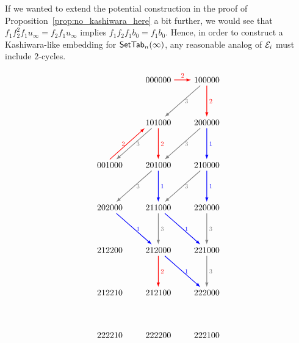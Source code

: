 \documentclass[11pt]{article}
\begin{document}
If we wanted to extend the potential construction in the proof of Proposition~\ref{prop:no_kashiwara_here} a bit further, we would see that $f_1 f_2^2 f_1 u_{\infty} = f_2 f_1 u_{\infty}$ implies $f_1 f_2 f_1 b_0 = f_1 b_0$.
Hence, in order to construct a Kashiwara-like embedding for $\mathsf{SetTab}_n(\infty)$, any reasonable analog of $\mathcal E_i$ must include $2$-cycles.


\begin{figure}[t]
\[
\begin{tikzpicture}[xscale=2, yscale=1.75,>=latex,baseline=(D0.base)]
\node at (1,0) (A1) {$000000$};
\node at (2,0) (A2) {$100000$};
%
\node at (1,-1) (B1) {$101000$};
\node at (2,-1) (B2) {$200000$};
%
\node at (0,-2) (C0) {$001000$};
\node at (1,-2) (C1) {$201000$};
\node at (2,-2) (C2) {$210000$};
%
\node at (0,-3) (D0) {$202000$};
\node at (1,-3) (D1) {$211000$};
\node at (2,-3) (D2) {$220000$};
%
\node at (0,-4) (E0) {$212200$};
\node at (1,-4) (E1) {$212000$};
\node at (2,-4) (E2) {$221000$};
%
\node at (0,-5) (F0) {$212210$};
\node at (1,-5) (F1) {$212100$};
\node at (2,-5) (F2) {$222000$};
%
\node at (0,-6) (G0) {$222210$};
\node at (1,-6) (G1) {$222200$};
\node at (2,-6) (G2) {$222100$};
\draw[->,thick,red]  (A1) -- (A2) node[midway,above,scale=0.75] {$2$};
%
\draw[->,thick,red]  (A2) -- (B2) node[midway,right,scale=0.75] {$2$};
\draw[->,thick,gray]  (A2) -- (B1) node[midway,right,scale=0.75] {$3$};
%
\draw[->,thick,gray]  (B1) -- (C0) node[midway,right,scale=0.75] {$3$};
\draw[->,thick,red]  (B1) -- (C1) node[midway,right,scale=0.75] {$2$};
\draw[->,thick,gray]  (B2) -- (C1) node[midway,right,scale=0.75] {$3$};
\draw[->,thick,blue]  (B2) -- (C2) node[midway,right,scale=0.75] {$1$};
%
\draw[->,thick,red]  ([xshift=0pt]C0.north) -- ([xshift=-8pt]B1.south) node[midway,left,scale=0.75] {$2$};
\draw[->,thick,gray]  (C1) -- (D0) node[midway,right,scale=0.75] {$3$};
\draw[->,thick,gray]  (C2) -- (D1) node[midway,right,scale=0.75] {$3$};
\draw[->,thick,blue]  (C1) -- (D1) node[midway,right,scale=0.75] {$1$};
\draw[->,thick,blue]  (C2) -- (D2) node[midway,right,scale=0.75] {$1$};
%
\draw[->,thick,gray]  (D1) -- (E1) node[midway,right,scale=0.75] {$3$};
\draw[->,thick,gray]  (D2) -- (E2) node[midway,right,scale=0.75] {$3$};
\draw[->,thick,blue]  (D0) -- (E1) node[midway,right,scale=0.75] {$1$};
\draw[->,thick,blue]  (D1) -- (E2) node[midway,right,scale=0.75] {$1$};
%
\draw[->,thick,blue]  (E1) -- (F2) node[midway,right,scale=0.75] {$1$};
\draw[->,thick,red]  (E1) -- (F1) node[midway,right,scale=0.75] {$2$};
\draw[->,thick,gray]  (E2) -- (F2) node[midway,right,scale=0.75] {$3$};

\end{tikzpicture}\]
\end{figure}
\end{document}
